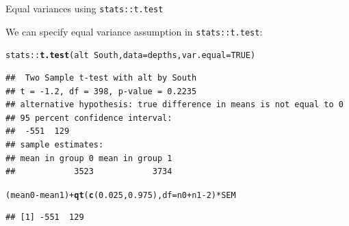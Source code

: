 \documentclass[10pt]{beamer}\usepackage[]{graphicx}\usepackage[]{color}
\makeatletter
\newcommand{\hlnum}[1]{\textcolor[rgb]{0.686,0.059,0.569}{#1}}%
\newcommand{\hlopt}[1]{\textcolor[rgb]{0,0,0}{#1}}%
\newcommand{\hlstd}[1]{\textcolor[rgb]{0.345,0.345,0.345}{#1}}%
\newcommand{\hlkwc}[1]{\textcolor[rgb]{0.333,0.667,0.333}{#1}}%
\newcommand{\hlkwd}[1]{\textcolor[rgb]{0.737,0.353,0.396}{\textbf{#1}}}%
\newenvironment{kframe}{%
 \def\at@end@of@kframe{}%
 \ifinner\ifhmode%
  \def\at@end@of@kframe{\end{minipage}}%
  \begin{minipage}{\columnwidth}%
 \fi\fi%
 \def\FrameCommand##1{\hskip\@totalleftmargin \hskip-\fboxsep
 \colorbox{shadecolor}{##1}\hskip-\fboxsep
     \hskip-\linewidth \hskip-\@totalleftmargin \hskip\columnwidth}%
 \MakeFramed {\advance\hsize-\width
   \@totalleftmargin\z@ \linewidth\hsize
   \@setminipage}}%
 {\par\unskip\endMakeFramed%
 \at@end@of@kframe}
\newenvironment{knitrout}{}{} %
\makeatother
\begin{document}
\begin{frame}[fragile]{Equal variances using \texttt{stats::t.test}}
	
	We can specify equal variance assumption in \texttt{stats::t.test}:
	
\begin{knitrout}\scriptsize
{}\color{fgcolor}\begin{kframe}
\begin{alltt}
\hlstd{stats}\hlopt{::}\hlkwd{t.test}\hlstd{(alt} \hlopt{~} \hlstd{South,} \hlkwc{data} \hlstd{= depths,} \hlkwc{var.equal} \hlstd{=} \hlnum{TRUE}\hlstd{)}
\end{alltt}
\begin{verbatim}
##  Two Sample t-test with alt by South 
## t = -1.2, df = 398, p-value = 0.2235
## alternative hypothesis: true difference in means is not equal to 0 
## 95 percent confidence interval:
##  -551  129 
## sample estimates:
## mean in group 0 mean in group 1 
##            3523            3734
\end{verbatim}
\begin{alltt}
\hlstd{(mean0} \hlopt{-} \hlstd{mean1)} \hlopt{+} \hlkwd{qt}\hlstd{(}\hlkwd{c}\hlstd{(}\hlnum{0.025}\hlstd{,} \hlnum{0.975}\hlstd{),} \hlkwc{df} \hlstd{= n0} \hlopt{+} \hlstd{n1} \hlopt{-} \hlnum{2}\hlstd{)} \hlopt{*} \hlstd{SEM}
\end{alltt}
\begin{verbatim}
## [1] -551  129
\end{verbatim}
\end{kframe}
\end{knitrout}
	
	
\end{frame}




\end{document}
